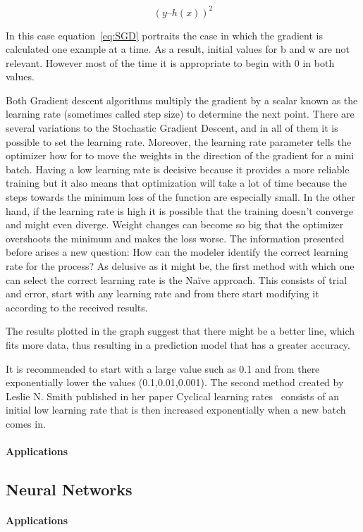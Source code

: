 \begin{equation} \label{eq:SGD}
(y – h(x))^2
\end{equation}


In this case equation~\ref{eq:SGD} portraits the case in which the gradient is calculated one example at a time. As a result, initial values for b and w are not relevant. However most of the time it is appropriate to begin with 0 in both values. 

Both Gradient descent algorithms multiply the gradient by a scalar known as the learning rate (sometimes called step size) to determine the next point.  There are several variations to the Stochastic Gradient Descent, and in all of them it is possible to set the learning rate.  Moreover, the learning rate parameter tells the optimizer how for to move the weights in the direction of the gradient for a mini batch. Having a low learning rate is decisive because it provides a more reliable training but it also means that optimization will take a lot of time because the steps towards the minimum loss of the function are especially small. In the other hand, if the learning rate is high it is possible that the training doesn’t converge and might even diverge.  Weight changes can become so big that the optimizer overshoots the minimum and makes the loss worse. The information presented before arises a new question: How can the modeler identify the correct learning rate for the process? 
As delusive as it might be, the first method with which one can select the correct learning rate is the Naïve approach. This consists of trial and error, start with any learning rate and from there start modifying it according to the received results. 


The results plotted in the graph suggest that there might be a better line, which fits more data, thus resulting in a prediction model that has a greater accuracy.


It is recommended to start with a large value such as 0.1 and from there exponentially lower the values (0.1,0.01,0.001).
The second method created by Leslie N. Smith published in her paper Cyclical learning rates~\cite{leslie15} consists of an initial low learning rate that is then increased exponentially when a new batch comes in.


\paragraph{Applications}



\subsection{Neural Networks}


\paragraph{Applications}




\endinput

